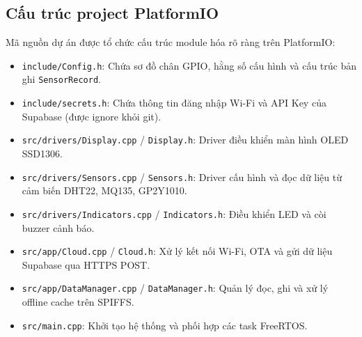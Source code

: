 \subsection{Cấu trúc project PlatformIO}
Mã nguồn dự án được tổ chức cấu trúc module hóa rõ ràng trên PlatformIO:
\begin{itemize}
    \item \texttt{include/Config.h}: Chứa sơ đồ chân GPIO, hằng số cấu hình và cấu trúc bản ghi \texttt{SensorRecord}.
    \item \texttt{include/secrets.h}: Chứa thông tin đăng nhập Wi-Fi và API Key của Supabase (được ignore khỏi git).
    \item \texttt{src/drivers/Display.cpp} / \texttt{Display.h}: Driver điều khiển màn hình OLED SSD1306.
    \item \texttt{src/drivers/Sensors.cpp} / \texttt{Sensors.h}: Driver cấu hình và đọc dữ liệu từ cảm biến DHT22, MQ135, GP2Y1010.
    \item \texttt{src/drivers/Indicators.cpp} / \texttt{Indicators.h}: Điều khiển LED và còi buzzer cảnh báo.
    \item \texttt{src/app/Cloud.cpp} / \texttt{Cloud.h}: Xử lý kết nối Wi-Fi, OTA và gửi dữ liệu Supabase qua HTTPS POST.
    \item \texttt{src/app/DataManager.cpp} / \texttt{DataManager.h}: Quản lý đọc, ghi và xử lý offline cache trên SPIFFS.
    \item \texttt{src/main.cpp}: Khởi tạo hệ thống và phối hợp các task FreeRTOS.
\end{itemize}

